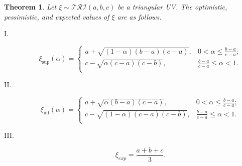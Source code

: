 \documentclass[10pt,a4paper]{amsart}
\newtheorem{theorem}{Theorem}
\begin{document}
\begin{theorem}\label{thm.4}
	Let $\xi\sim \mathcal{TRI}(a,b,c)$ be a triangular UV. The optimistic, pessimistic, and expected values of $\xi$ are as follows.
	\begin{description}
		\item[ I.]  
		\[\xi_{\sup}(\alpha)=\left\{
		\begin{array}{ll}
			a+\sqrt{(1-\alpha)(b-a)(c-a)}, & 0<\alpha\leq \frac{b-a}{c-a};\\
			c-\sqrt{\alpha(c-a)(c-b)}, &  \frac{b-a}{c-a}\leq\alpha<1.\\
		\end{array}
		\right.
		\]
		\item[ II.]  \[\xi_{\inf}(\alpha)=\left\{
		\begin{array}{ll}
			a+\sqrt{\alpha(b-a)(c-a)}, & 0<\alpha\leq \frac{b-a}{c-a};\\
			c-\sqrt{(1-\alpha)(c-a)(c-b)}, &  \frac{b-a}{c-a}\leq\alpha<1.\\
		\end{array}
		\right.
		\]
		\item[ III.]  $$\xi_{exp}=\frac{a+b+c}{3}.$$
	\end{description} 
\end{theorem}
\end{document}
